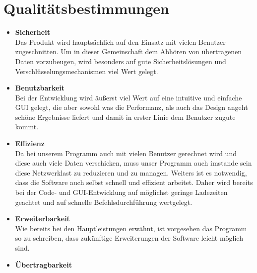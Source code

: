 \documentclass[a4paper,12pt]{scrreprt}
\begin{document}
\chapter{Qualitätsbestimmungen}
\begin{itemize}
	\item {\LARGE\textbf{Sicherheit}}\\
	Das Produkt wird hauptsächlich auf den Einsatz mit vielen Benutzer zugeschnitten. Um in dieser Gemeinschaft dem Abhören von übertragenen Daten vorzubeugen, wird besonders auf gute Sicherheitslösungen und Verschlüsselungsmechanismen viel Wert gelegt.
	\item {\LARGE\textbf{Benutzbarkeit}}\\
	Bei der Entwicklung wird äußerst viel Wert auf eine intuitive und einfache GUI gelegt, die aber sowohl was die Performanz, als auch das Design angeht schöne Ergebnisse liefert und damit in erster Linie dem Benutzer zugute kommt.
	\item {\LARGE\textbf{Effizienz}}\\
	Da bei unserem Programm auch mit vielen Benutzer gerechnet wird und diese auch viele Daten verschicken, muss unser Programm auch imstande sein diese Netzwerklast zu reduzieren und zu managen. Weiters ist es notwendig, dass die Software auch selbst schnell und effizient arbeitet. Daher wird bereits bei der Code- und GUI-Entwicklung auf möglichst geringe Ladezeiten geachtet und auf schnelle Befehlsdurchführung wertgelegt.
	\item {\LARGE\textbf{Erweiterbarkeit}}\\
	Wie bereits bei den Hauptleistungen erwähnt, ist vorgesehen das Programm so zu schreiben, dass zukünftige Erweiterungen der Software leicht möglich sind.
	\item {\LARGE\textbf{Übertragbarkeit}}	\\
	\end{itemize}
\end{document}
